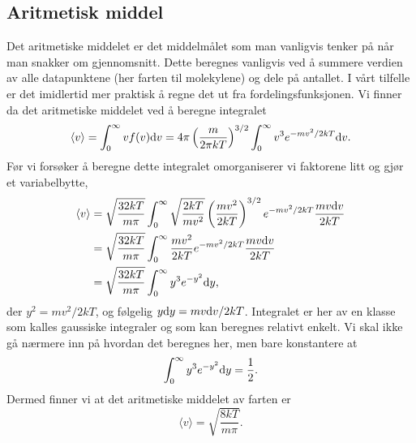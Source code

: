 \subsection{Aritmetisk middel}
Det aritmetiske middelet er det middelmålet som man vanligvis tenker på når man snakker om gjennomsnitt. Dette beregnes vanligvis ved å summere verdien av alle datapunktene (her farten til molekylene) og dele på antallet. I vårt tilfelle er det imidlertid mer praktisk å regne det ut fra fordelingsfunksjonen. Vi finner da det aritmetiske middelet ved å beregne integralet
\begin{displaymath}
	\langle v \rangle = \int_0^\infty v f(v) \text{d} v = 4\pi\left(\frac{m}{2\pi kT}\right)^{3/2} \int_0^\infty v^3 e^{-mv^2/2kT} \text{d} v.
\end{displaymath}
Før vi forsøker å beregne dette integralet omorganiserer vi faktorene litt og gjør et variabelbytte,
\begin{displaymath}
\begin{aligned}
	\langle v \rangle &= \sqrt{\frac{32kT}{m\pi}} \int_0^\infty \sqrt{\frac{2kT}{mv^2}}\left(\frac{mv^2}{2 kT}\right)^{3/2}  e^{-mv^2/2kT}\frac{mv\text{d} v}{2kT} \\
	&= \sqrt{\frac{32kT}{m\pi}} \int_0^\infty \frac{mv^2}{2 kT} e^{-mv^2/2kT}\frac{mv\text{d} v}{2kT} \\
	&=   \sqrt{\frac{32kT}{m\pi}}  \int_0^\infty y^3 e^{-y^2} \text{d} y,
\end{aligned}
\end{displaymath}
der $y^2 = mv^2/2kT$, og følgelig $y\text{d} y = mv\text{d} v/2kT$. Integralet er her av en klasse som kalles gaussiske integraler og som kan beregnes relativt enkelt. Vi skal ikke gå nærmere inn på hvordan det beregnes her, men bare konstantere at
\begin{displaymath}
	\int_0^\infty y^3 e^{-y^2} \text{d} y = \frac{1}{2}.
\end{displaymath}
Dermed finner vi at det aritmetiske middelet av farten er
\begin{equation}
	\langle v \rangle = \sqrt{\frac{8kT}{m\pi}}.
\end{equation}


